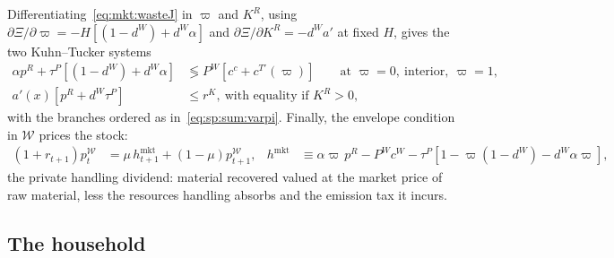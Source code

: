 Differentiating~\eqref{eq:mkt:wasteJ} in $\varpi$ and $K^R$, using $\partial\Xi/\partial\varpi=-H\left[\left(1-d^W\right)+d^W\alpha\right]$ and $\partial\Xi/\partial K^R=-d^Wa'$ at fixed $H$, gives the two Kuhn--Tucker systems
\begin{subequations}
\label{eq:mkt:focwaste}
\begin{align}
\alpha p^R+\tau^P\left[\left(1-d^W\right)+d^W\alpha\right] &\lessgtr P^W\left[c^c+c^{T\prime}\left(\varpi\right)\right]
\qquad\text{at }\varpi=0,\ \text{interior},\ \varpi=1,
\label{eq:mkt:focvarpi}
\\
a'\!\left(x\right)\left[p^R+d^W\tau^P\right] &\le r^K,\ \text{with equality if }K^R>0 ,
\label{eq:mkt:focKR}
\end{align}
\end{subequations}
with the branches ordered as in~\eqref{eq:sp:sum:varpi}. Finally, the envelope condition in $\mathcal W$ prices the stock:
\begin{align}
\left(1+r_{t+1}\right)p^{\mathcal W}_t &= \mu\,h^{\mathrm{mkt}}_{t+1}+\left(1-\mu\right)p^{\mathcal W}_{t+1},
&
h^{\mathrm{mkt}} &\equiv \alpha\varpi\,p^R-P^Wc^W-\tau^P\left[1-\varpi\left(1-d^W\right)-d^W\alpha\varpi\right],
\label{eq:mkt:pWstock}
\end{align}
the private handling dividend: material recovered valued at the market price of raw material, less the resources handling absorbs and the emission tax it incurs.

\subsection{The household}\label{sec:mkt:eq:hh}

